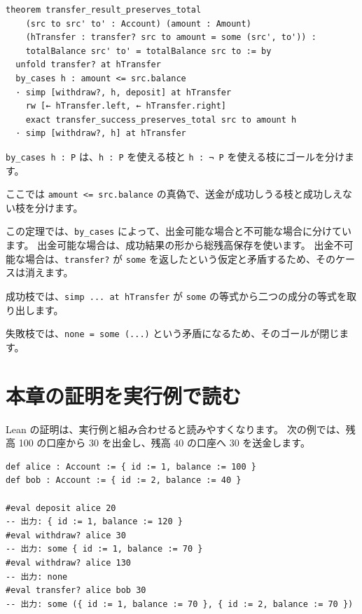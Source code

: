\begin{listing}[htbp]
\begin{verbatim}
theorem transfer_result_preserves_total
    (src to src' to' : Account) (amount : Amount)
    (hTransfer : transfer? src to amount = some (src', to')) :
    totalBalance src' to' = totalBalance src to := by
  unfold transfer? at hTransfer
  by_cases h : amount <= src.balance
  · simp [withdraw?, h, deposit] at hTransfer
    rw [← hTransfer.left, ← hTransfer.right]
    exact transfer_success_preserves_total src to amount h
  · simp [withdraw?, h] at hTransfer
\end{verbatim}
\caption{\texttt{transfer\_result\_preserves\_total}}
\label{lst:ch25-transfer-result-total}
\end{listing}

\texttt{by\_cases h : P} は、\texttt{h : P} を使える枝と \texttt{h : ¬ P} を使える枝にゴールを分けます。

ここでは \texttt{amount <= src.balance} の真偽で、送金が成功しうる枝と成功しえない枝を分けます。

この定理では、\texttt{by\_cases} によって、出金可能な場合と不可能な場合に分けています。
出金可能な場合は、成功結果の形から総残高保存を使います。
出金不可能な場合は、\texttt{transfer?} が \texttt{some} を返したという仮定と矛盾するため、そのケースは消えます。

成功枝では、\texttt{simp ... at hTransfer} が \texttt{some} の等式から二つの成分の等式を取り出します。

失敗枝では、\texttt{none = some (...)} という矛盾になるため、そのゴールが閉じます。

\section{本章の証明を実行例で読む}

Lean の証明は、実行例と組み合わせると読みやすくなります。
次の例では、残高 100 の口座から 30 を出金し、残高 40 の口座へ 30 を送金します。

\begin{listing}[htbp]
\begin{verbatim}
def alice : Account := { id := 1, balance := 100 }
def bob : Account := { id := 2, balance := 40 }

#eval deposit alice 20
-- 出力: { id := 1, balance := 120 }
#eval withdraw? alice 30
-- 出力: some { id := 1, balance := 70 }
#eval withdraw? alice 130
-- 出力: none
#eval transfer? alice bob 30
-- 出力: some ({ id := 1, balance := 70 }, { id := 2, balance := 70 })
\end{verbatim}
\caption{\texttt{alice}・\texttt{bob}}
\label{lst:ch25-eval-examples}
\end{listing}

